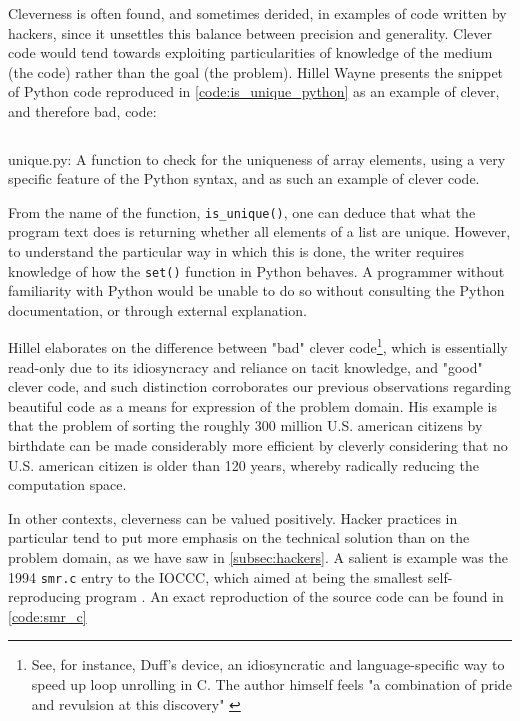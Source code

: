 Cleverness is often found, and sometimes derided, in examples of code written by hackers, since it unsettles this balance between precision and generality. Clever code would tend towards exploiting particularities of knowledge of the medium (the code) rather than the goal (the problem). Hillel Wayne presents the snippet of Python code reproduced in \ref{code:is_unique_python} as an example of clever, and therefore bad, code:

\begin{listing}
  \inputminted{python}{./corpus/unique.py}
  \caption{unique.py: A function to check for the uniqueness of array elements, using a very specific feature of the Python syntax, and as such an example of clever code.}
  \label{code:is_unique_python}
\end{listing}

From the name of the function, \lstinline{is_unique()}, one can deduce that what the program text does is returning whether all elements of a list are unique. However, to understand the particular way in which this is done, the writer requires knowledge of how the \lstinline{set()} function in Python behaves. A programmer without familiarity with Python would be unable to do so without consulting the Python documentation, or through external explanation.

Hillel elaborates on the difference between "bad" clever code\footnote{See, for instance, Duff's device, an idiosyncratic and language-specific way to speed up loop unrolling in C. The author himself feels "a combination of pride and revulsion at this discovery" \citep{duff_tom_1983}}, which is essentially read-only due to its idiosyncracy and reliance on tacit knowledge, and "good" clever code, and such distinction corroborates our previous observations regarding beautiful code as a means for expression of the problem domain. His example is that the problem of sorting the roughly 300 million U.S. american citizens by birthdate can be made considerably more efficient by cleverly considering that no U.S. american citizen is older than 120 years, whereby radically reducing the computation space.

In other contexts, cleverness can be valued positively. Hacker practices in particular tend to put more emphasis on the technical solution than on the problem domain, as we have saw in \ref{subsec:hackers}. A salient is example was the 1994 \lstinline{smr.c} entry to the IOCCC, which aimed at being the smallest self-reproducing program \citep{kanakarakis_international_2022}. An exact reproduction of the source code can be found in \ref{code:smr_c}

